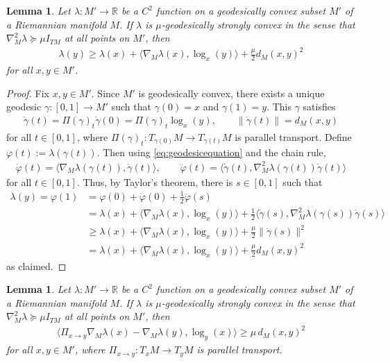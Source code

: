 \documentclass{article}
\newcommand{\RB}{\mathbb{R}}
\theoremstyle{plain}
\newtheorem{lemma}[theorem]{Lemma}
\theoremstyle{definition}
\theoremstyle{remark}
\begin{document}
\begin{lemma}\label{lem:geoconvex1}
    Let $\lambda:M'\rightarrow \RB$ be a $C^2$ function on a geodesically convex subset $M'$ of a Riemannian manifold $M$. If $\lambda$ is $\mu$-geodesically strongly convex in the sense that $\nabla^2_M\lambda\succeq\mu I_{TM}$ at all points on $M'$, then
    \begin{align}
        \lambda(y)\geq \lambda(x) + \langle \nabla_M\lambda(x),\log_x(y)\rangle  + \frac{\mu}{2}d_M(x,y)^2
    \end{align}
    for all $x,y\in M'$.
\end{lemma}

\begin{proof}
    Fix $x,y\in M'$. Since $M'$ is geodesically convex, there exists a unique geodesic $\gamma:[0,1]\rightarrow M'$ such that $\gamma(0) = x$ and $\gamma(1) = y$. This $\gamma$ satisfies
    \begin{align}
        \dot{\gamma}(t) = \Pi(\gamma)_t\dot{\gamma}(0) = \Pi(\gamma)_t\log_x(y),\qquad \|\dot{\gamma}(t)\| = d_M(x,y)
    \end{align}
    for all $t\in[0,1]$, where $\Pi(\gamma)_t:T_{\gamma(0)}M\rightarrow T_{\gamma(t)}M$ is parallel transport. Define $\varphi(t):=\lambda(\gamma(t))$. Then using \eqref{eq:geodesicequation} and the chain rule,
    \begin{align}
        \dot{\varphi}(t) = \langle \nabla_M\lambda(\gamma(t)),\dot{\gamma}(t)\rangle,\qquad \ddot{\varphi}(t) = \langle \dot{\gamma}(t),\nabla^2_M\lambda(\gamma(t))\dot{\gamma}(t)\rangle
    \end{align}
    for all $t\in[0,1]$. Thus, by Taylor's theorem, there is $s\in[0,1]$ such that
    \begin{align}
        \lambda(y) = \varphi(1)&= \varphi(0) + \dot{\varphi}(0) + \frac{1}{2}\ddot{\varphi}(s)\\&=\lambda(x) + \langle\nabla_M\lambda(x),\log_x(y)\rangle + \frac{1}{2}\langle\dot{\gamma}(s),\nabla^2_M\lambda(\gamma(s))\dot{\gamma}(s)\rangle\\&\geq \lambda(x) + \langle \nabla_M\lambda(x),\log_x(y)\rangle + \frac{\mu}{2}\|\dot{\gamma}(s)\|^2\\&=\lambda(x) + \langle\nabla_M\lambda(x),\log_x(y)\rangle + \frac{\mu}{2}d_M(x,y)^2
    \end{align}
    as claimed.
\end{proof}

\begin{lemma}\label{lem:geoconvex2}
    Let $\lambda:M'\rightarrow \RB$ be a $C^2$ function on a geodesically convex subset $M'$ of a Riemannian manifold $M$. If $\lambda$ is $\mu$-geodesically strongly convex in the sense that $\nabla^2_M\lambda\succeq\mu I_{TM}$ at all points on $M'$, then
    \begin{align}
        \langle \Pi_{x\rightarrow y}\nabla_M\lambda(x)-\nabla_M\lambda(y),\log_y(x)\rangle \geq \mu\, d_M(x,y)^2
    \end{align}
    for all $x,y\in M'$, where $\Pi_{x\rightarrow y}:T_xM\rightarrow T_yM$ is parallel transport.
\end{lemma}
\end{document}
